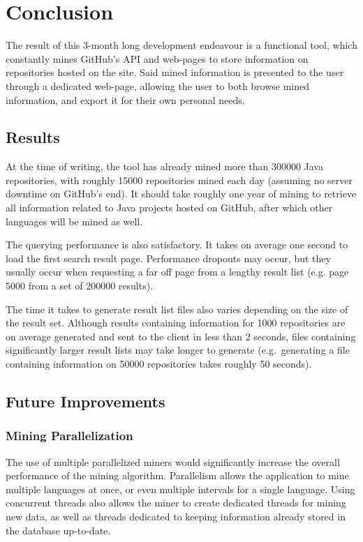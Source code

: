 \chapter{Conclusion}\label{ch:6}

The result of this 3-month long development endeavour is a functional tool, which constantly mines GitHub's API and web-pages to store information on repositories hosted on the site.
Said mined information is presented to the user through a dedicated web-page, allowing the user to both browse mined information, and export it for their own personal needs.

\section{Results}

At the time of writing, the tool has already mined more than 300000 Java repositories, with roughly 15000 repositories mined each day (assuming no server downtime on GitHub's end).
It should take roughly one year of mining to retrieve all information related to Java projects hosted on GitHub, after which other languages will be mined as well.

The querying performance is also satisfactory.
It takes on average one second to load the first search result page.
Performance dropouts may occur, but they usually occur when requesting a far off page from a lengthy result list (e.g. page 5000 from a set of 200000 results).

The time it takes to generate result list files also varies depending on the size of the result set.
Although results containing information for 1000 repositories are on average generated and sent to the client in less than 2 seconds, files containing significantly larger result lists may take longer to generate (e.g.\ generating a file containing information on 50000 repositories takes roughly 50 seconds).

\section{Future Improvements}

\subsection{Mining Parallelization}

The use of multiple parallelized miners would significantly increase the overall performance of the mining algorithm.
Parallelism allows the application to mine multiple languages at once, or even multiple intervals for a single language.
Using concurrent threads also allows the miner to create dedicated threads for mining new data, as well as threads dedicated to keeping information already stored in the database up-to-date.

